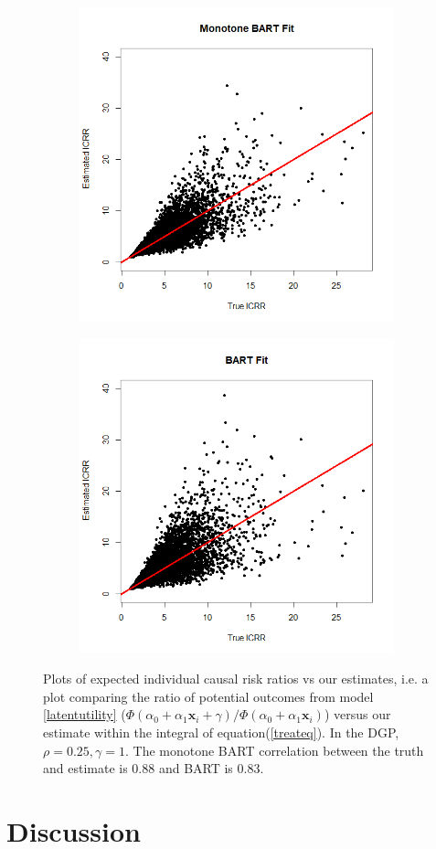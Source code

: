 \documentclass[aoas,preprint, 11pt, dvipsnames, table, x11name]{imsart}
\renewcommand{\bm}[1]{\mathbf{#1}}
\theoremstyle{remark}
\begin{document}
	\begin{figure}[h]
		\centering
		\begin{subfigure}{.4\textwidth}
			\includegraphics[width=5.cm]{monobart_ICRR_png.png}
		\end{subfigure}%
		\begin{subfigure}{.4\textwidth}
			\includegraphics[width=5.cm]{Bart_ICRR_png.png}
		\end{subfigure}
		\caption[Comparing Bart with and without monotinicity constraint]{Plots of expected individual causal risk ratios vs our estimates, i.e. a plot comparing the ratio of potential outcomes from model \ref{latentutility} ($\Phi(\alpha_0+\alpha_1\bm{x}_i+\gamma)/\Phi(\alpha_0+\alpha_1\bm{x}_i)$) versus our estimate within the integral of equation(\ref{treateq}).  In the DGP, $\rho=0.25,\gamma=1$.  The monotone BART correlation between the truth and estimate is 0.88 and BART is 0.83.}
		\label{monovsnorm}
	\end{figure}
	
	
	\section{Discussion}
	
\end{document}
